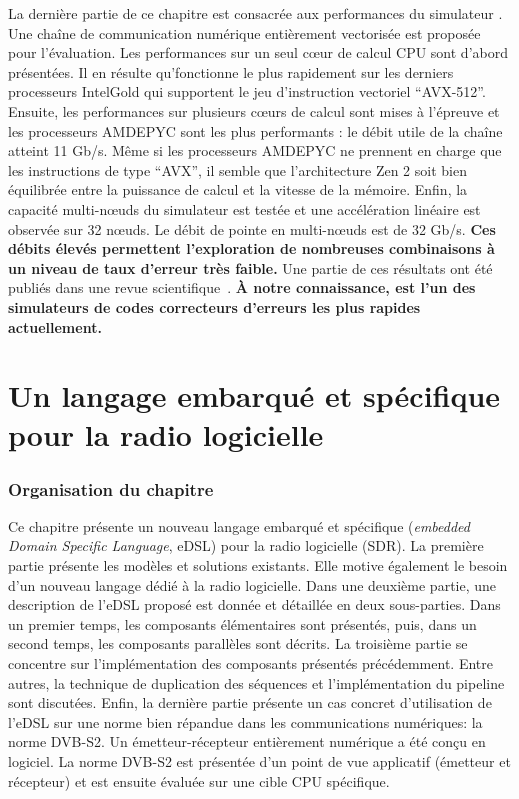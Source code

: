 La dernière partie de ce chapitre est consacrée aux performances du simulateur
\AFFECT. Une chaîne de communication numérique entièrement vectorisée est
proposée pour l'évaluation. Les performances sur un seul cœur de calcul CPU sont
d'abord présentées. Il en résulte qu'\AFFECT fonctionne le plus rapidement sur
les derniers processeurs Intel\R Gold qui supportent le jeu d'instruction
vectoriel ``AVX-512''. Ensuite, les performances sur plusieurs cœurs de calcul
sont mises à l'épreuve et les processeurs AMD\R EPYC sont les plus performants :
le débit utile de la chaîne atteint 11 Gb/s. Même si les processeurs AMD\R EPYC
ne prennent en charge que les instructions de type ``AVX'', il semble que
l'architecture Zen 2 soit bien équilibrée entre la puissance de calcul et la
vitesse de la mémoire. Enfin, la capacité multi-nœuds du simulateur \AFFECT est
testée et une accélération linéaire est observée sur 32 nœuds. Le débit de
pointe en multi-nœuds est de 32 Gb/s. \textbf{Ces débits élevés permettent
l'exploration de nombreuses combinaisons à un niveau de taux d'erreur très
faible.} Une partie de ces résultats ont été publiés dans une revue
scientifique~\cite{Cassagne2019a}. \textbf{À notre connaissance, \AFFECT est
l'un des simulateurs de codes correcteurs d'erreurs les plus rapides
actuellement.}

\section*{Un langage embarqué et spécifique pour la radio logicielle}

\subsubsection*{Organisation du chapitre}

Ce chapitre présente un nouveau langage embarqué et spécifique (\emph{embedded
Domain Specific Language}, eDSL) pour la radio logicielle (SDR). La première
partie présente les modèles et solutions existants. Elle motive également le
besoin d'un nouveau langage dédié à la radio logicielle. Dans une deuxième
partie, une description de l'eDSL proposé est donnée et détaillée en deux
sous-parties. Dans un premier temps, les composants élémentaires sont présentés,
puis, dans un second temps, les composants parallèles sont décrits. La troisième
partie se concentre sur l'implémentation des composants présentés précédemment.
Entre autres, la technique de duplication des séquences et l'implémentation du
pipeline sont discutées. Enfin, la dernière partie présente un cas concret
d'utilisation de l'eDSL sur une norme bien répandue dans les communications
numériques: la norme DVB-S2. Un émetteur-récepteur entièrement numérique a été
conçu en logiciel. La norme DVB-S2 est présentée d'un point de vue applicatif
(émetteur et récepteur) et est ensuite évaluée sur une cible CPU spécifique.

